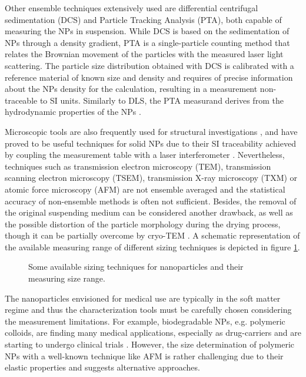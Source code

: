 Other ensemble techniques extensively used are differential centrifugal sedimentation (DCS) \citep{fielding_correcting_2012} and Particle Tracking Analysis (PTA), both capable of measuring the NPs in suspension. While DCS is based on the sedimentation of NPs through a density gradient, PTA is a single-particle counting method that relates the Brownian movement of the particles with the measured laser light scattering. The particle size distribution obtained with DCS is calibrated with a reference material of known size and density and requires of precise information about the NPs density for the calculation, resulting in a measurement non-traceable to SI units. Similarly to DLS, the PTA measurand derives from the hydrodynamic properties of the NPs \citep{varga_towards_2014}.

Microscopic tools are also frequently used for structural investigations \citep{joensson_morphology_1991,silverstein_microstructure_1989}, and have proved to be useful techniques for solid NPs due to their SI traceability achieved by coupling the measurement table with a laser interferometer \citep{meli_traceable_2012}. Nevertheless, techniques such as transmission electron microscopy (TEM), transmission scanning electron microscopy (TSEM), transmission X-ray microscopy (TXM) or atomic force microscopy (AFM) are not ensemble averaged and the statistical accuracy of non-ensemble methods is often not sufficient. Besides, the removal of the original suspending medium can be considered another drawback, as well as the possible distortion of the particle morphology during the drying process, though it can be partially overcome by cryo-TEM \citep{li_doxorubicin_1998}. A schematic representation of the available measuring range of different sizing techniques is depicted in figure \ref{fig:SizeRange}.

\begin{figure}[hbt]%
	\centering
	        \def\svgwidth{0.95\linewidth}
		
		\caption[Sizing techniques.]{Some available sizing techniques for nanoparticles and their measuring size range.}
		\label{fig:SizeRange}
\end{figure}

The nanoparticles envisioned for medical use are typically in the soft matter regime and thus the characterization tools must be carefully chosen considering the measurement limitations. For example, biodegradable NPs, e.g. polymeric colloids, are finding many medical applications, especially as drug-carriers \citep{kattan_phase_1992,vicent_polymer_2006} and are starting to undergo clinical trials \citep{patel_polymeric_2012,beija_colloidal_2012,cabral_progress_2014}. However, the size determination of polymeric NPs with a well-known technique like AFM is rather challenging due to their elastic properties \citep{wu_particle_2014} and suggests alternative approaches.

